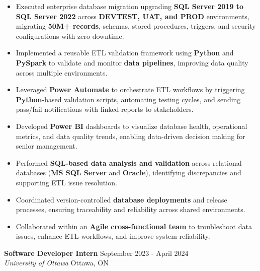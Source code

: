 \documentclass[a4paper]{article}
\begin{document}
\begin{itemize} \itemsep -2pt
\item Executed enterprise database migration upgrading \textbf{SQL Server 2019 to SQL Server 2022} across \textbf{DEVTEST, UAT, and PROD} environments, migrating \textbf{50M+ records}, schemas, stored procedures, triggers, and security configurations with zero downtime.
\item Implemented a reusable ETL validation framework using \textbf{Python} and \textbf{PySpark} to validate and monitor \textbf{data pipelines}, improving data quality across multiple environments.
\item Leveraged \textbf{Power Automate} to orchestrate ETL workflows by triggering \textbf{Python}-based validation scripts, automating testing cycles, and sending pass/fail notifications with linked reports to stakeholders.
\item Developed \textbf{Power BI} dashboards to visualize database health, operational metrics, and data quality trends, enabling data-driven decision making for senior management.
\item Performed \textbf{SQL-based data analysis and validation} across relational databases (\textbf{MS SQL Server} and \textbf{Oracle}), identifying discrepancies and supporting ETL issue resolution.
\item Coordinated version-controlled \textbf{database deployments} and release processes, ensuring traceability and reliability across shared environments.
\item Collaborated within an \textbf{Agile cross-functional team} to troubleshoot data issues, enhance ETL workflows, and improve system reliability.
\end{itemize}
\textbf{Software Developer Intern} \hfill September 2023 - April 2024\\
\textit{University of Ottawa} \hfill Ottawa, ON\\
\vspace{-2mm}
\end{document}
